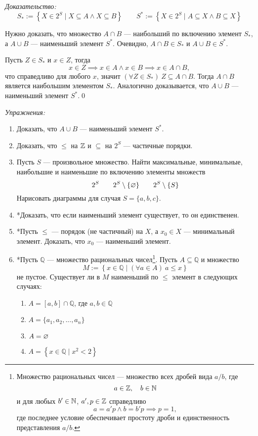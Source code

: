 {\it Доказательство:}
\[
	S_{*}:=\left\{X\in 2^{S}\;\big|\; X\subseteq A\land X\subseteq B\right\}\qquad
	S^{*}:=\left\{X\in 2^{S}\;\big|\; A\subseteq X\land B\subseteq X\right\}
\]

Нужно доказать, что множество $A\cap B$ --- наибольший по включению элемент $S_{*}$,
а $A\cup B$ --- наименьший элемент $S^{*}$.
Очевидно, $A\cap B\in S_{*}$ и $A\cup B\in S^{*}$.

Пусть $Z\in S_{*}$ и $x\in Z$, тогда
\[
	x\in Z\implies x\in A\land x\in B\implies x\in A\cap B,
\]
что справедливо для любого $x$,
значит ${(\forall Z\in S_{*})~Z\subseteq A\cap B}$. Тогда
$A\cap B$ является наибольшим элементом $S_{*}$.
Аналогично доказывается, что $A\cup B$ --- наименьший элемент $S^{*}$.\qed

\newcommand\Q{\mathbb Q}
\vspace{1em}
{\it Упражнения:}
\begin{enumerate}
	\item{}Доказать, что $A\cup B$ --- наименьший элемент $S^{*}$.
	\item{}Доказать, что $\leq$ на $\mathbb Z$ и $\subseteq$ на $2^{S}$ --- частичные порядки.
	\item{}Пусть $S$ --- произвольное множество.
	Найти максимальные, минимальные, наибольшие и
	наименьшие по включению элементы множеств
	\[
		2^{S}\qquad 2^{S}\setminus\{\varnothing\}\qquad
		2^{S}\setminus \{S\}
	\]
	Нарисовать диаграммы для случая $S=\{a,b,c\}$.
	\item{}*Доказать, что если наименьший элемент существует, то
	он единственен.
	\item{}*Пусть $\leq$ --- порядок (не частичный) на $X$, а $x_0\in X$ --- минимальный
	элемент. Доказать, что $x_0$ --- наименьший элемент.
	\item{}*Пусть $\Q$ --- множество рациональных чисел\footnote{
		Множество рациональных
		чисел --- множество всех дробей вида $a/b$, где
		\[
			a\in\mathbb Z,\quad b\in\mathbb N
		\]
		и для любых ${b'\in\mathbb N}$, ${a',p\in\mathbb Z}$ справедливо
		\[
			a=a'p\land b=b'p\implies p=1,
		\]
		где последнее условие обеспечивает простоту дроби
		и единственность представления $a/b$.}.
	Пусть $A\subseteq \Q$ и множество
	\[
		M:=\left\{x\in \Q\;\big|\;(\forall a\in A)~a\leq x\right\}
	\]
	не пустое. Существует ли в $M$ наименьший по $\leq$ элемент
	в следующих случаях:
	\begin{multicols}{2}
		\begin{enumerate}
			\item{}$A=[a,b]\cap\Q$, где $a,b\in\Q$
			\item{}$A=\{a_1,a_2,...,a_{n}\}$
			\item{}$A=\varnothing$
			\item{}$A=\left\{x\in\Q\;\big|\; x^{2}<2\right\}$
		\end{enumerate}
	\end{multicols}
\end{enumerate}

